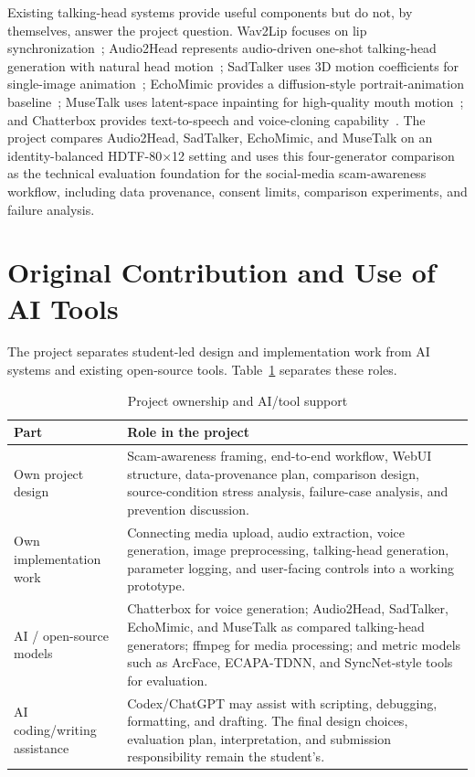 \documentclass[10pt,conference]{IEEEtran}
\begin{document}
Existing talking-head systems provide useful components but do not, by themselves, answer the project question. Wav2Lip focuses on lip synchronization~\cite{wav2lip}; Audio2Head represents audio-driven one-shot talking-head generation with natural head motion~\cite{audio2head}; SadTalker uses 3D motion coefficients for single-image animation~\cite{sadtalker}; EchoMimic provides a diffusion-style portrait-animation baseline~\cite{echomimic}; MuseTalk uses latent-space inpainting for high-quality mouth motion~\cite{musetalk}; and Chatterbox provides text-to-speech and voice-cloning capability~\cite{chatterbox}. The project compares Audio2Head, SadTalker, EchoMimic, and MuseTalk on an identity-balanced HDTF-80$\times$12 setting and uses this four-generator comparison as the technical evaluation foundation for the social-media scam-awareness workflow, including data provenance, consent limits, comparison experiments, and failure analysis.

\section{Original Contribution and Use of AI Tools}
The project separates student-led design and implementation work from AI systems and existing open-source tools. Table~\ref{tab:own_ai} separates these roles.

\begin{table}[H]
\caption{Project ownership and AI/tool support}
\label{tab:own_ai}
\centering
\scriptsize
\begin{tabular}{@{}p{}p{}@{}}
\toprule
\textbf{Part} & \textbf{Role in the project} \\
\midrule
Own project design & Scam-awareness framing, end-to-end workflow, WebUI structure, data-provenance plan, comparison design, source-condition stress analysis, failure-case analysis, and prevention discussion. \\
\addlinespace
Own implementation work & Connecting media upload, audio extraction, voice generation, image preprocessing, talking-head generation, parameter logging, and user-facing controls into a working prototype. \\
\addlinespace
AI / open-source models & Chatterbox for voice generation; Audio2Head, SadTalker, EchoMimic, and MuseTalk as compared talking-head generators; ffmpeg for media processing; and metric models such as ArcFace, ECAPA-TDNN, and SyncNet-style tools for evaluation. \\
\addlinespace
AI coding/writing assistance & Codex/ChatGPT may assist with scripting, debugging, formatting, and drafting. The final design choices, evaluation plan, interpretation, and submission responsibility remain the student's. \\
\bottomrule
\end{tabular}
\end{table}
\end{document}
